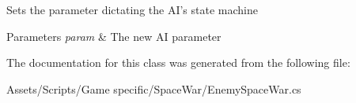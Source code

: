 Sets the parameter dictating the A\-I's state machine 


\begin{DoxyParams}{Parameters}
{\em param} & The new A\-I parameter\\
\hline
\end{DoxyParams}


The documentation for this class was generated from the following file\-:\begin{DoxyCompactItemize}
\item 
Assets/\-Scripts/\-Game specific/\-Space\-War/Enemy\-Space\-War.\-cs\end{DoxyCompactItemize}

